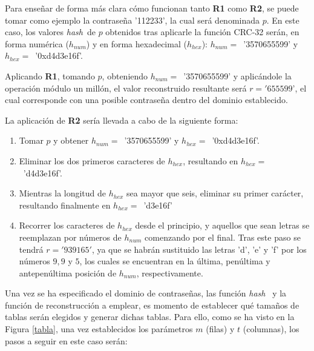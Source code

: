 \documentclass[12pt,spanish,listoffigures,listoftables]{tfgetsinf}
\newcommand{\hash}{\textit{hash}}
\begin{document}
Para enseñar de forma más clara cómo funcionan tanto \textbf{R1} como \textbf{R2}, se puede tomar como ejemplo la contraseña '112233', la cual será denominada $p$. En este caso, los valores \hash~de $p$ obtenidos tras aplicarle la función CRC-32 serán, en forma numérica ($h_{num}$) y en forma hexadecimal ($h_{hex}$): $h_{num} =$~'3570655599' y $h_{hex} =$~'0xd4d3e16f'.

Aplicando \textbf{R1}, tomando $p$, obteniendo $h_{num} =$~'3570655599' y aplicándole la operación módulo un millón, el valor reconstruido resultante será $r = '655599$', el cual corresponde con una posible contraseña dentro del dominio establecido.

La aplicación de \textbf{R2} sería llevada a cabo de la siguiente forma:

\begin{enumerate}

    \item Tomar $p$ y obtener $h_{num} =$~'3570655599' y $h_{hex} =$~'0xd4d3e16f'.
    
    \item Eliminar los dos primeros caracteres de $h_{hex}$, resultando en $h_{hex} =$~'d4d3e16f'.
    
    \item Mientras la longitud de $h_{hex}$ sea mayor que seis, eliminar su primer carácter, resultando finalmente en $h_{hex} =$~'d3e16f'
    
    \item Recorrer los caracteres de $h_{hex}$ desde el principio, y aquellos que sean letras se reemplazan por números de $h_{num}$ comenzando por el final. Tras este paso se tendrá $r = '939165'$, ya que se habrán sustituido las letras 'd', 'e' y 'f' por los números $9, 9$ y $5$, los cuales se encuentran en la última, penúltima y antepenúltima posición de $h_{num}$, respectivamente.
    
\end{enumerate}

Una vez se ha especificado el dominio de contraseñas, las función \hash~ y la función de reconstrucción a emplear, es momento de establecer qué tamaños de tablas serán elegidos y generar dichas tablas. Para ello, como se ha visto en la Figura \ref{tabla}, una vez establecidos los parámetros $m$ (filas) y $t$ (columnas), los pasos a seguir en este caso serán:
\end{document}

